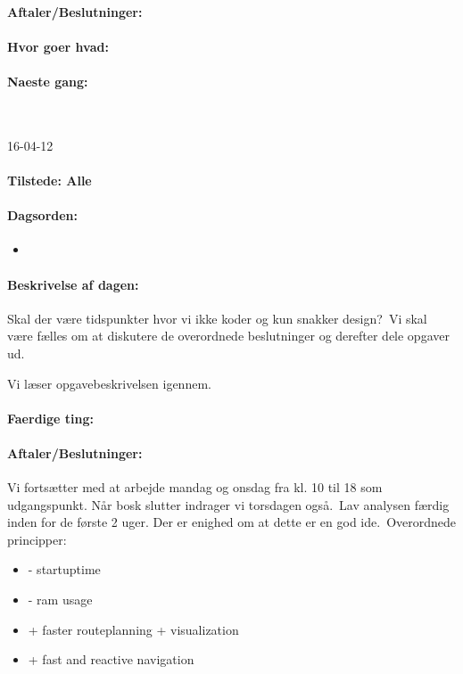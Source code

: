 \documentclass[a4paper,10pt,titlepage]{article}
\begin{document}
		\paragraph{Aftaler/Beslutninger:}
		
		\paragraph{Hvor goer hvad:}
		
		\paragraph{Naeste gang:}\mbox{}\\
		
		\begin{center}
		16-04-12
		\end{center}
		
		\paragraph{Tilstede: Alle}
		\paragraph{Dagsorden:}
		\begin{itemize}
					\item 
					
		\end{itemize}
		
		\paragraph{Beskrivelse af dagen:}
		Skal der være tidspunkter hvor vi ikke koder og kun snakker design?\
Vi skal være fælles om at diskutere de overordnede beslutninger og derefter dele opgaver ud.\

Vi læser opgavebeskrivelsen igennem.

		\paragraph{Faerdige ting:}
		
		\paragraph{Aftaler/Beslutninger:}
		Vi fortsætter med at arbejde mandag og onsdag fra kl. 10 til 18 som udgangspunkt. Når bosk slutter indrager vi torsdagen også.\
		Lav analysen færdig inden for de første 2 uger. Der er enighed om at dette er en god ide.\
		Overordnede principper:
		\begin{itemize}
		\item - startuptime
		\item - ram usage
		\item + faster routeplanning + visualization
		\item + fast and reactive navigation
		\end{itemize}
			
\end{document}
